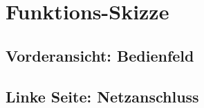 %
%

\chapter{Funktions-Skizze}
\section {Vorderansicht: Bedienfeld}

%
\section {Linke Seite: Netzanschluss}
